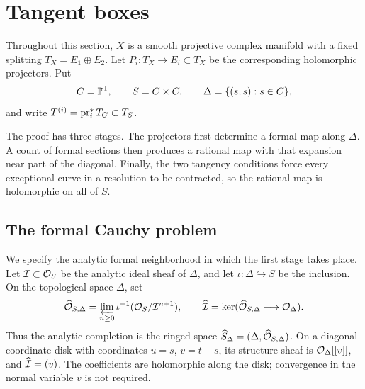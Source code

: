 \section{Tangent boxes}\label{sec:boxes}

Throughout this section, \(X\) is a smooth projective complex manifold
with a fixed splitting \(T_X=E_1\oplus E_2\).
Let \(P_i:T_X\to E_i\subset T_X\) be the corresponding holomorphic
projectors. Put
\[
C=\mathbb P^1,\qquad S=C\times C,\qquad
\Delta=\{(s,s):s\in C\},
\]
and write \(T^{(i)}=\operatorname{pr}_i^*T_C\subset T_S\).


The proof has three stages. The projectors first determine a formal
map along \(\Delta\). A count of formal sections then produces a
rational map with that expansion near part of the diagonal. Finally,
the two tangency conditions force every exceptional curve in a
resolution to be contracted, so the rational map is holomorphic on
all of \(S\).

\subsection{The formal Cauchy problem}

We specify the analytic formal neighborhood in which the first stage
takes place. Let \(\mathcal I\subset\mathcal O_S\) be the analytic ideal
sheaf of \(\Delta\), and let \(\iota:\Delta\hookrightarrow S\) be
the inclusion. On the topological space \(\Delta\), set
\[
\widehat{\mathcal O}_{S,\Delta}
 =\varprojlim_{n\ge0}\iota^{-1}(\mathcal O_S/\mathcal I^{n+1}),
\qquad
\widehat{\mathcal I}=\ker(\widehat{\mathcal O}_{S,\Delta}\longrightarrow\mathcal O_\Delta).
\]
Thus the analytic completion is the ringed space
\(\widehat S_\Delta=(\Delta,\widehat{\mathcal O}_{S,\Delta})\). On a diagonal
coordinate disk with coordinates \(u=s\), \(v=t-s\), its structure
sheaf is \(\mathcal O_\Delta[[v]]\), and \(\widehat{\mathcal I}=(v)\).
The coefficients are holomorphic along the disk; convergence in the
normal variable \(v\) is not required.

